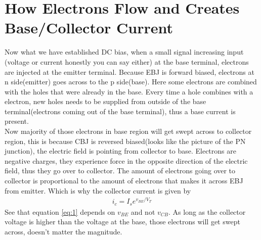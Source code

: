 \documentclass{article}
\begin{document}
	\section{How Electrons Flow and Creates Base/Collector Current}
		Now what we have established DC bias, when a small signal increasing input (voltage or current honestly you can say either) at the base terminal, electrons are injected at the emitter terminal. Because EBJ is forward biased, electrons at n side(emitter) goes across to the p side(base). Here some electrons are combined with the holes that were already in the base. Every time a hole combines with a electron, new holes needs to be supplied from outside of the base terminal(electrons coming out of the base terminal), thus a base current is present.\\
		Now majority of those electrons in base region will get swept across to collector region, this is because CBJ is reversed biased(looks like the picture of the PN junction), the electric field is pointing from collector to base. Electrons are negative charges, they experience force in the opposite direction of the electric field, thus they go over to collector. The amount of electrons going over to collector is proportional to the amount of electrons that makes it across EBJ from emitter. Which is why the collector current is given by
		\begin{align}
			\label{eq:1}
			i_c=I_{s}e^{v_{BE}/V_{T}}
		\end{align}
		See that equation \ref{eq:1} depends on $v_{BE}$ and not $v_{CB}$. As long as the collector voltage is higher than the voltage at the base, those electrons will get swept across, doesn't matter the magnitude.
\end{document}

